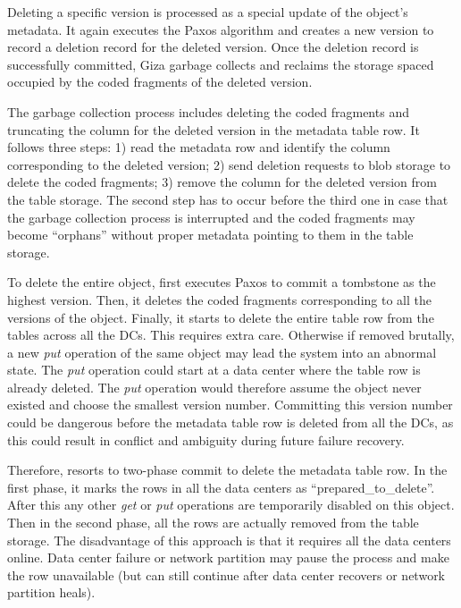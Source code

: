 Deleting a specific version is processed as a special update of the object's metadata.
It again executes the Paxos algorithm and creates a new version to record a deletion record for the deleted version.
Once the deletion record is successfully committed,
Giza garbage collects and reclaims the storage spaced occupied by the coded fragments of the deleted version.


The garbage collection process includes deleting the coded fragments and
truncating the column for the deleted version in the metadata table row.
It follows three steps:
1) read the metadata row and identify the column corresponding to the deleted version;
2) send deletion requests to blob storage to delete the coded fragments;
3) remove the column for the deleted version from the table storage.
The second step has to occur before the third one in case that
the garbage collection process is interrupted and the coded fragments may become ``orphans''
without proper metadata pointing to them in the table storage.

To delete the entire object, 
{\name} first executes Paxos to commit a tombstone as the highest version.
Then, it deletes the coded fragments corresponding to all the versions of the object.
Finally, it starts to delete the entire table row from the tables across all the DCs.
This requires extra care. Otherwise if removed brutally, 
a new {\em put} operation of the same object may lead the system into an abnormal state.
The {\em put} operation could start at a data center where the table row is already deleted.
The {\em put} operation would therefore assume the object never existed and choose the smallest version number.
Committing this version number could be dangerous before the metadata table row is deleted from all the DCs,
as this could result in conflict and ambiguity during future failure recovery.

Therefore, {\name} resorts to two-phase commit to delete the metadata table row.
In the first phase, it marks the rows in all the data centers as ``prepared\_to\_delete''.
After this any other {\em get} or {\em put} operations are temporarily disabled on this object.
Then in the second phase, all the rows are actually removed from the table storage.
The disadvantage of this approach is that it requires all the data centers online.
Data center failure or network partition may pause the process and make the row unavailable
(but can still continue after data center recovers or network partition heals). 



